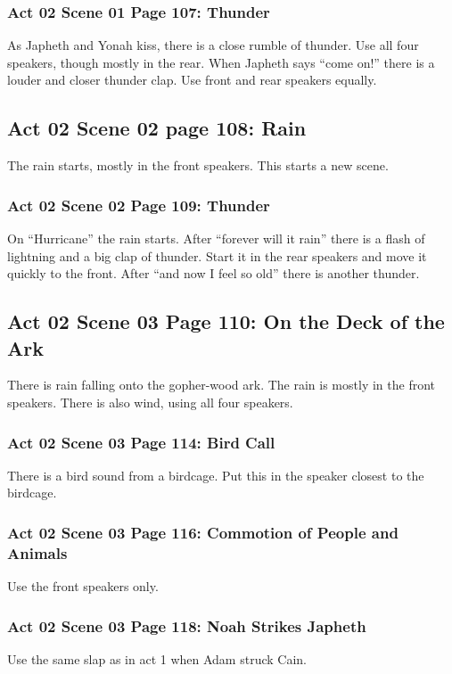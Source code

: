 \documentclass[letterpaper,twoside]{article}
\begin{document}
\subsubsection{Act 02 Scene 01 Page 107: Thunder}
As Japheth and Yonah kiss, there is a close rumble of thunder.
Use all four speakers, though mostly in the rear.
When Japheth says ``come on!'' there is a louder and closer
thunder clap.  Use front and rear speakers equally.

\subsection{Act 02 Scene 02 page 108: Rain}
The rain starts, mostly in the front speakers.  This starts a new scene.

\subsubsection{Act 02 Scene 02 Page 109: Thunder}
On ``Hurricane'' the rain starts.
After ``forever will it rain'' there is a flash of lightning
and a big clap of thunder.  Start it in the rear speakers
and move it quickly to the front.
After ``and now I feel so old'' there is another thunder.

\subsection{Act 02 Scene 03 Page 110: On the Deck of the Ark}
There is rain falling onto the gopher-wood ark.
The rain is mostly in the front speakers.
There is also wind, using all four speakers.

\subsubsection{Act 02 Scene 03 Page 114: Bird Call}
There is a bird sound from a birdcage.  Put this in the speaker
closest to the birdcage.

\subsubsection{Act 02 Scene 03 Page 116: Commotion of People and Animals}
Use the front speakers only.

\subsubsection{Act 02 Scene 03 Page 118: Noah Strikes Japheth}
Use the same slap as in act 1 when Adam struck Cain.
\end{document}
